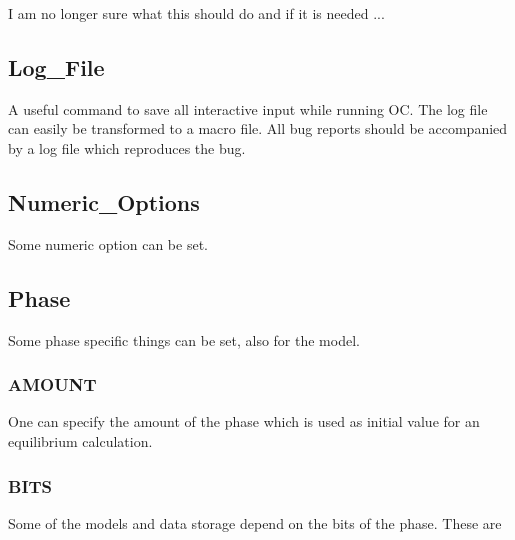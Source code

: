 \documentclass[12pt]{article}
\begin{document}
I am no longer sure what this should do and if it is needed ...

\subsection{Log\_File}

A useful command to save all interactive input while running OC.  The
log file can easily be transformed to a macro file.  All bug reports
should be accompanied by a log file which reproduces the bug.

\subsection{Numeric\_Options}

Some numeric option can be set.

\subsection{Phase}

Some phase specific things can be set, also for the model.

\subsubsection{AMOUNT}

One can specify the amount of the phase which is used as initial value
for an equilibrium calculation.

\subsubsection{BITS}

Some of the models and data storage depend on the bits of the phase.
These are
\end{document}
